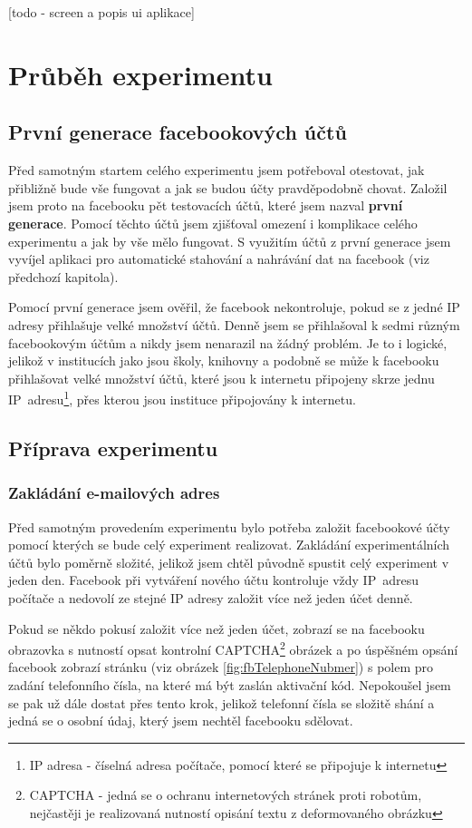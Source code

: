 \documentclass[thesis=M,czech]{FITthesis}[2013/05/10]
\begin{document}
[todo - screen a popis ui aplikace]



\chapter{Průběh experimentu}

\section{První generace facebookových účtů}

Před samotným startem celého experimentu jsem potřeboval otestovat, jak přibližně bude vše fungovat a jak se budou účty pravděpodobně chovat. Založil jsem proto na facebooku pět testovacích účtů, které jsem nazval \textbf{první generace}. Pomocí těchto účtů jsem zjišťoval omezení i komplikace celého experimentu a jak by vše mělo fungovat. S využitím účtů z první generace jsem vyvíjel aplikaci pro automatické stahování a nahrávání dat na facebook (viz předchozí kapitola).

Pomocí první generace jsem ověřil, že facebook nekontroluje, pokud se z jedné IP adresy přihlašuje velké množství účtů. Denně jsem se přihlašoval k sedmi různým facebookovým účtům a nikdy jsem nenarazil na žádný problém. Je to i logické, jelikož v institucích jako jsou školy, knihovny a podobně se může k facebooku přihlašovat velké množství účtů, které jsou k internetu připojeny skrze jednu IP~adresu\footnote{IP adresa - číselná adresa počítače, pomocí které se připojuje k internetu}, přes kterou jsou instituce připojovány k internetu.

\section{Příprava experimentu}

\subsection{Zakládání e-mailových adres}

Před samotným provedením experimentu bylo potřeba založit facebookové účty pomocí kterých se bude celý experiment realizovat. Zakládání experimentálních účtů bylo poměrně složité, jelikož jsem chtěl původně spustit celý experiment v jeden den. Facebook při vytváření nového účtu kontroluje vždy IP~adresu počítače a nedovolí ze stejné IP adresy založit více než jeden účet denně. 

Pokud se někdo pokusí založit více než jeden účet, zobrazí se na facebooku obrazovka s nutností opsat kontrolní CAPTCHA\footnote{CAPTCHA - jedná se o ochranu internetových stránek proti robotům, nejčastěji je realizovaná nutností opisání textu z deformovaného obrázku} obrázek a po úspěšném opsání facebook zobrazí stránku (viz obrázek \ref{fig:fbTelephoneNubmer}) s polem pro zadání telefonního čísla, na které má být zaslán aktivační kód. Nepokoušel jsem se pak už dále dostat přes tento krok, jelikož telefonní čísla se složitě shání a jedná se o osobní údaj, který jsem nechtěl facebooku sdělovat.
\end{document}
